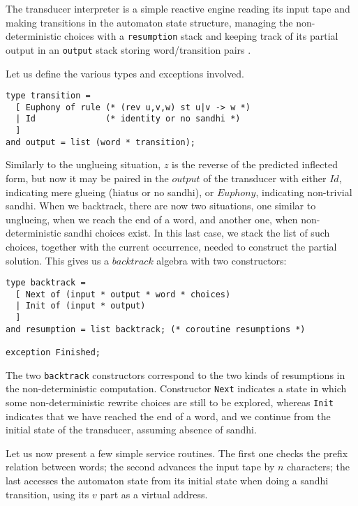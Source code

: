 The transducer interpreter is a simple reactive engine reading its input tape
and making transitions in the automaton state structure, managing
the non-deterministic choices with a \verb:resumption: stack and keeping
track of its 
partial output in an \verb:output: stack storing word/transition pairs .

Let us define the various types and exceptions involved.

\begin{verbatim}
type transition =
  [ Euphony of rule (* (rev u,v,w) st u|v -> w *)
  | Id              (* identity or no sandhi *)
  ]
and output = list (word * transition); 
\end{verbatim}
Similarly to the unglueing situation, $z$ is the reverse of
the predicted inflected form, but now it may be paired in the $output$ of
the transducer with either $Id$, indicating mere glueing (hiatus or
no sandhi), or $Euphony$,
indicating non-trivial sandhi. When we backtrack, there are now two situations,
one similar to unglueing, when we reach the end of a word, and another
one, when non-deterministic sandhi choices exist. In this last case, we 
stack the list of such choices, together with the current occurrence,
needed to construct the partial solution. This gives us a $backtrack$ 
algebra with two constructors:
\begin{verbatim}
type backtrack =
  [ Next of (input * output * word * choices)
  | Init of (input * output)
  ]
and resumption = list backtrack; (* coroutine resumptions *)

exception Finished;
\end{verbatim}

The two \verb:backtrack: constructors correspond to the
two kinds of resumptions in the non-deterministic computation. 
Constructor \verb:Next: indicates a state in which some non-deterministic 
rewrite choices are still to be explored, whereas \verb:Init: indicates that we
have reached the end of a word, and we continue from the initial state
of the transducer, assuming absence of sandhi. 

Let us now present a few simple service routines. The first one
checks the prefix relation between words; 
the second advances the input tape by $n$ characters; 
the last accesses the automaton state from its initial state
when doing a sandhi transition, using its $v$ part as a virtual address.

